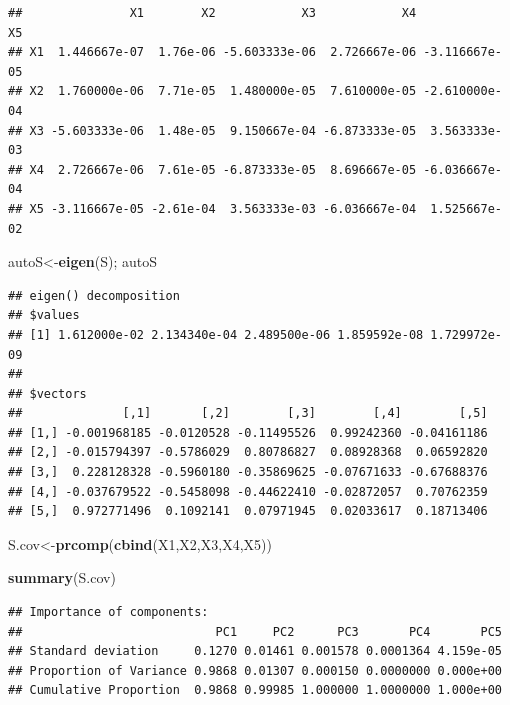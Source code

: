 \documentclass[
]{book}
\newenvironment{Shaded}{\begin{snugshade}}{\end{snugshade}}
\newcommand{\KeywordTok}[1]{\textcolor[rgb]{0.13,0.29,0.53}{\textbf{#1}}}
\newcommand{\NormalTok}[1]{#1}
\begin{document}
\begin{verbatim}
##               X1        X2            X3            X4            X5
## X1  1.446667e-07  1.76e-06 -5.603333e-06  2.726667e-06 -3.116667e-05
## X2  1.760000e-06  7.71e-05  1.480000e-05  7.610000e-05 -2.610000e-04
## X3 -5.603333e-06  1.48e-05  9.150667e-04 -6.873333e-05  3.563333e-03
## X4  2.726667e-06  7.61e-05 -6.873333e-05  8.696667e-05 -6.036667e-04
## X5 -3.116667e-05 -2.61e-04  3.563333e-03 -6.036667e-04  1.525667e-02
\end{verbatim}

\begin{Shaded}
\begin{Highlighting}[]
\NormalTok{autoS<-}\KeywordTok{eigen}\NormalTok{(S); }
\NormalTok{autoS}
\end{Highlighting}
\end{Shaded}

\begin{verbatim}
## eigen() decomposition
## $values
## [1] 1.612000e-02 2.134340e-04 2.489500e-06 1.859592e-08 1.729972e-09
## 
## $vectors
##              [,1]       [,2]        [,3]        [,4]        [,5]
## [1,] -0.001968185 -0.0120528 -0.11495526  0.99242360 -0.04161186
## [2,] -0.015794397 -0.5786029  0.80786827  0.08928368  0.06592820
## [3,]  0.228128328 -0.5960180 -0.35869625 -0.07671633 -0.67688376
## [4,] -0.037679522 -0.5458098 -0.44622410 -0.02872057  0.70762359
## [5,]  0.972771496  0.1092141  0.07971945  0.02033617  0.18713406
\end{verbatim}

\begin{Shaded}
\begin{Highlighting}[]
\NormalTok{S.cov<-}\KeywordTok{prcomp}\NormalTok{(}\KeywordTok{cbind}\NormalTok{(X1,X2,X3,X4,X5))}
\end{Highlighting}
\end{Shaded}

\begin{Shaded}
\begin{Highlighting}[]
\KeywordTok{summary}\NormalTok{(S.cov)}
\end{Highlighting}
\end{Shaded}

\begin{verbatim}
## Importance of components:
##                           PC1     PC2      PC3       PC4       PC5
## Standard deviation     0.1270 0.01461 0.001578 0.0001364 4.159e-05
## Proportion of Variance 0.9868 0.01307 0.000150 0.0000000 0.000e+00
## Cumulative Proportion  0.9868 0.99985 1.000000 1.0000000 1.000e+00
\end{verbatim}
\end{document}
